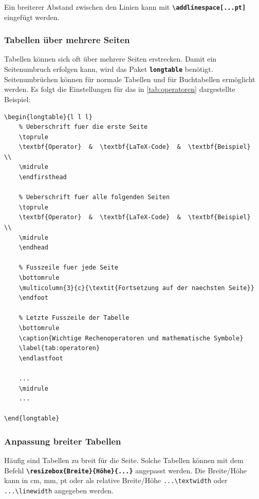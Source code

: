 Ein breiterer Abstand zwischen den Linien kann mit \textbf{\texttt{\textbackslash addlinespace[...pt]}} eingefügt werden.

\newpage

\subsubsection{Tabellen über mehrere Seiten}
Tabellen können sich oft über mehrere Seiten erstrecken. Damit ein Seitenumbruch erfolgen kann, wird das Paket \textbf{\texttt{longtable}} benötigt. Seitenumbrüchen können für normale Tabellen und für Buchtabellen ermöglicht werden. Es folgt die Einstellungen für das in \autoref{tab:operatoren} dargestellte Beispiel:

\begin{lstlisting}[language={[LaTeX]TeX}, emph={\endfirsthead,\endhead,\endfoot,\endlastfoot}, emphstyle={\color{red}}]
\begin{longtable}{l l l}
    % Ueberschrift fuer die erste Seite
    \toprule
    \textbf{Operator}  &  \textbf{LaTeX-Code}  &  \textbf{Beispiel}  \\
    \midrule
    \endfirsthead

    % Ueberschrift fuer alle folgenden Seiten
    \toprule
    \textbf{Operator}  &  \textbf{LaTeX-Code}  &  \textbf{Beispiel}  \\
    \midrule
    \endhead

    % Fusszeile fuer jede Seite
    \bottomrule
    \multicolumn{3}{c}{\textit{Fortsetzung auf der naechsten Seite}}
    \endfoot

    % Letzte Fusszeile der Tabelle
    \bottomrule
    \caption{Wichtige Rechenoperatoren und mathematische Symbole}
    \label{tab:operatoren}
    \endlastfoot

    ... 
    \midrule
    ... 

\end{longtable}
\end{lstlisting}

\subsubsection{Anpassung breiter Tabellen}
Häufig sind Tabellen zu breit für die Seite. Solche Tabellen können mit dem Befehl \textbf{\texttt{\textbackslash resizebox\{Breite\}\{Höhe\}\{...\}}} angepasst werden. Die Breite/Höhe kann in cm, mm, pt oder als relative Breite/Höhe \texttt{...\textbackslash textwidth} oder \texttt{...\textbackslash linewidth} angegeben werden.

